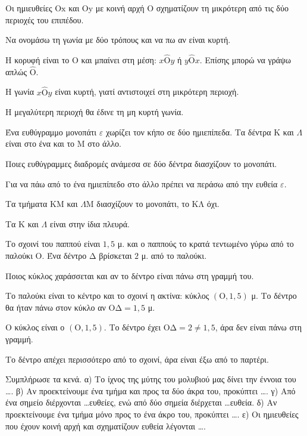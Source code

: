 \tixero Οι ημιευθείες $\mathrm{Οx}$ και $\mathrm{Οy}$ με κοινή αρχή $\mathrm{Ο}$ σχηματίζουν τη μικρότερη από τις δύο περιοχές του επιπέδου.\par
\tithelo Να ονομάσω τη γωνία με δύο τρόπους και να πω αν είναι κυρτή.\par
\possindeo Η κορυφή είναι το $\mathrm{Ο}$ και μπαίνει στη μέση: $x\hat{\mathrm{Ο}}y$ ή $y\hat{\mathrm{Ο}}x$. Επίσης μπορώ να γράψω απλώς $\hat{\mathrm{Ο}}$.\par
\apantisi Η γωνία $x\hat{\mathrm{Ο}}y$ είναι κυρτή, γιατί αντιστοιχεί στη μικρότερη περιοχή.\par
\elegxos Η μεγαλύτερη περιοχή θα έδινε τη μη κυρτή γωνία.

\tixero Ένα ευθύγραμμο μονοπάτι $\varepsilon$ χωρίζει τον κήπο σε δύο ημιεπίπεδα. Τα δέντρα $\mathrm{Κ}$ και $\Lambda$ είναι στο ένα και το $\mathrm{Μ}$ στο άλλο.\par
\tithelo Ποιες ευθύγραμμες διαδρομές ανάμεσα σε δύο δέντρα διασχίζουν το μονοπάτι.\par
\possindeo Για να πάω από το ένα ημιεπίπεδο στο άλλο πρέπει να περάσω από την ευθεία $\varepsilon$.\par
\apantisi Τα τμήματα $\mathrm{ΚΜ}$ και $\Lambda\mathrm{Μ}$ διασχίζουν το μονοπάτι, το $\mathrm{ΚΛ}$ όχι.\par
\elegxos Τα $\mathrm{Κ}$ και $\Lambda$ είναι στην ίδια πλευρά.

\tixero Το σχοινί του παππού είναι $1{,}5$ μ. και ο παππούς το κρατά τεντωμένο γύρω από το παλούκι $\mathrm{Ο}$. Ένα δέντρο $\mathrm{Δ}$ βρίσκεται $2$ μ. από το παλούκι.\par
\tithelo Ποιος κύκλος χαράσσεται και αν το δέντρο είναι πάνω στη γραμμή του.\par
\possindeo Το παλούκι είναι το κέντρο και το σχοινί η ακτίνα: κύκλος $(\mathrm{Ο},1{,}5)$ μ. Το δέντρο θα ήταν πάνω στον κύκλο αν $\mathrm{ΟΔ}=1{,}5$ μ.\par
\apantisi Ο κύκλος είναι ο $(\mathrm{Ο},1{,}5)$. Το δέντρο έχει $\mathrm{ΟΔ}=2\neq1{,}5$, άρα δεν είναι πάνω στη γραμμή.\par
\elegxos Το δέντρο απέχει περισσότερο από το σχοινί, άρα είναι έξω από το παρτέρι.



\ex Συμπλήρωσε τα κενά. α) Το ίχνος της μύτης του μολυβιού μας δίνει την έννοια του \dots. β) Αν προεκτείνουμε ένα τμήμα και προς τα δύο άκρα του, προκύπτει \dots. γ) Από ένα σημείο διέρχονται \dots ευθείες, ενώ από δύο σημεία διέρχεται \dots ευθεία. δ) Αν προεκτείνουμε ένα τμήμα μόνο προς το ένα άκρο του, προκύπτει \dots. ε) Οι ημιευθείες που έχουν κοινή αρχή και σχηματίζουν ευθεία λέγονται \dots.


